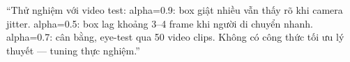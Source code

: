 \documentclass[12pt, a4paper]{article}
\begin{document}
\begin{tcolorbox}[colback=gray!5, colframe=OliveGreen!80!black, breakable,
  title={\textbf{Q: Tại sao alpha=0.7 mà không phải 0.5 hay 0.9?}}]
``Thử nghiệm với video test:
alpha=0.9: box giật nhiều vẫn thấy rõ khi camera jitter.
alpha=0.5: box lag khoảng 3--4 frame khi người di chuyển nhanh.
alpha=0.7: cân bằng, eye-test qua 50 video clips.
Không có công thức tối ưu lý thuyết --- tuning thực nghiệm.''
\end{tcolorbox}
\end{document}
